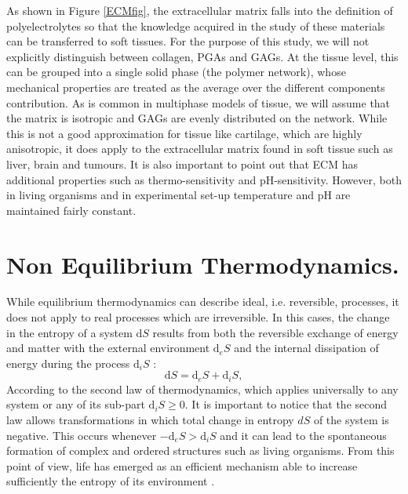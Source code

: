 \documentclass[runningheads]{llncs}
\renewcommand{\d}{\ensuremath{\text{d}}}
\begin{document}
As shown in Figure \ref{ECMfig}, the extracellular matrix falls into the definition of polyelectrolytes so that the knowledge acquired in the study of these materials can be transferred to soft tissues. For the purpose of this study, we will not explicitly distinguish between collagen, PGAs and GAGs. At the tissue level, this can be grouped into a single solid phase (the polymer network), whose mechanical properties are treated as the average over the different components contribution. As is common in multiphase models of tissue, we will assume that the matrix is isotropic and GAGs are evenly distributed on the network. While this is not a good approximation for tissue like cartilage, which are highly anisotropic, it does apply to the extracellular matrix found in soft tissue such as liver, brain and tumours. It is also important to point out that ECM has additional properties such as thermo-sensitivity and pH-sensitivity. However, both in living organisms and in experimental set-up temperature and pH are maintained fairly constant.

\section{Non Equilibrium Thermodynamics.}
\label{secNET}
While equilibrium thermodynamics can describe ideal, i.e. reversible, processes, it does not apply to real processes which are irreversible. In this cases, the change in the entropy of a system $\d S$ results from both the reversible exchange of energy and matter with the external environment $\d_eS$ and the internal dissipation of energy during the process $\d_iS$ \cite{NET}:
\begin{equation}
\d S = \d_eS + \d_iS, 
\end{equation}
According to the second law of thermodynamics, which applies universally to any system or any of its sub-part $\d_i S\ge 0$. It is important to notice that the second law allows transformations in which total change in entropy $d S$ of the system is negative. This occurs whenever $-\d_e S>\d_i S$ and it can lead to the spontaneous formation of complex and ordered structures such as living organisms. From this point of view, life has emerged as an efficient mechanism able to increase sufficiently the entropy of its environment \cite{JeremyEngland}.  
\end{document}
